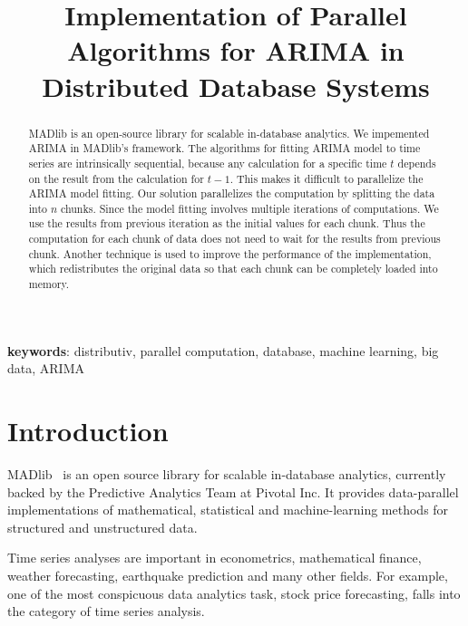 \documentclass[english,10pt]{llncs}
\begin{document}
\title{Implementation of Parallel Algorithms for ARIMA in Distributed
  Database Systems}


\maketitle

\begin{abstract}
    MADlib is an open-source library for scalable in-database analytics. We
    impemented ARIMA in MADlib's framework. The algorithms for fitting ARIMA
    model to time series are intrinsically sequential, because any calculation
    for a specific time $t$ depends on the result from the calculation for
    $t-1$.  This makes it difficult to parallelize the ARIMA model fitting. Our
    solution parallelizes the computation by splitting the data into $n$
    chunks. Since the model fitting involves multiple iterations of
    computations. We use the results from previous iteration as the initial
    values for each chunk. Thus the computation for each chunk of data does not
    need to wait for the results from previous chunk. Another technique is used
    to improve the performance of the implementation, which redistributes the
    original data so that each chunk can be completely loaded into memory.
\end{abstract}

{\bf keywords}: distributiv, parallel computation, database, machine
learning, big data, ARIMA


\section{Introduction}

MADlib~\cite{madlib} is an open source library for scalable
in-database analytics, currently backed by the Predictive Analytics
Team at Pivotal Inc. It provides data-parallel implementations of
mathematical, statistical and machine-learning methods for structured
and unstructured data.

Time series analyses are important in econometrics, mathematical
finance, weather forecasting, earthquake prediction and many other
fields. For example, one of the most conspicuous data analytics task,
stock price forecasting, falls into the category of time series
analysis.
\end{document}
